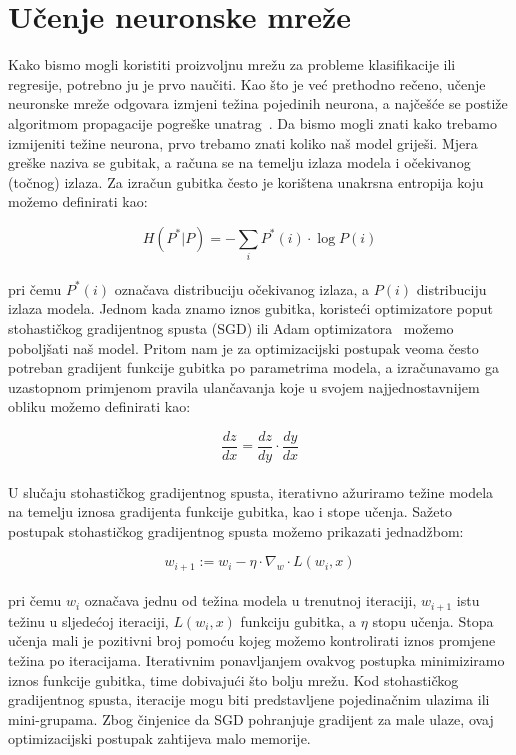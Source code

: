\documentclass[times, utf8, zavrsni, numeric]{fer}
\begin{document}
\section{Učenje neuronske mreže}
Kako bismo mogli koristiti proizvoljnu mrežu za probleme klasifikacije ili regresije, potrebno ju je prvo naučiti. 
Kao što je već prethodno rečeno, učenje neuronske mreže odgovara izmjeni težina pojedinih neurona, a najčešće se postiže algoritmom propagacije pogreške unatrag~\cite{Goodfellow-et-al-2016}.
Da bismo mogli znati kako trebamo izmijeniti težine neurona, prvo trebamo znati koliko naš model griješi. Mjera greške naziva se gubitak, a računa se na temelju izlaza modela i očekivanog (točnog) izlaza.
Za izračun gubitka često je korištena unakrsna entropija koju možemo definirati kao:

\begin{equation}
    H(P^{*}|P) = -\sum_{i}P^{*}(i) \cdot \log{P(i)}
    \label{eq:cross_entropy}
\end{equation}
\\
pri čemu $P^{*}(i)$ označava distribuciju očekivanog izlaza, a $P(i)$ distribuciju izlaza modela.
Jednom kada znamo iznos gubitka, koristeći optimizatore poput stohastičkog gradijentnog spusta (SGD) ili Adam optimizatora~\cite{kingma2014adam} možemo poboljšati naš model. 
Pritom nam je za optimizacijski postupak veoma često potreban gradijent funkcije gubitka po parametrima modela, a izračunavamo ga uzastopnom primjenom pravila ulančavanja koje u svojem najjednostavnijem obliku možemo definirati kao:

\begin{equation}
    \frac{dz}{dx} = \frac{dz}{dy} \cdot \frac{dy}{dx}
    \label{eq:chain_rule}
\end{equation}
\\
U slučaju stohastičkog gradijentnog spusta, iterativno ažuriramo težine modela na temelju iznosa gradijenta funkcije gubitka, kao i stope učenja. Sažeto postupak stohastičkog gradijentnog spusta možemo prikazati jednadžbom:

\begin{equation}
    w_{i+1} := w_{i} - \eta \cdot \nabla_{w} \cdot L(w_{i}, x)
    \label{eq:sgd}
\end{equation}
\\
pri čemu $w_{i}$ označava jednu od težina modela u trenutnoj iteraciji, $w_{i+1}$ istu težinu u sljedećoj iteraciji, $L(w_{i}, x)$ funkciju gubitka, a $\eta$ stopu učenja. 
Stopa učenja mali je pozitivni broj pomoću kojeg možemo kontrolirati iznos promjene težina po iteracijama. Iterativnim ponavljanjem ovakvog postupka minimiziramo iznos funkcije gubitka, time dobivajući što bolju mrežu.
Kod stohastičkog gradijentnog spusta, iteracije mogu biti predstavljene pojedinačnim ulazima ili mini-grupama. Zbog činjenice da SGD pohranjuje gradijent za male ulaze, ovaj optimizacijski postupak zahtijeva malo memorije.
\end{document}
